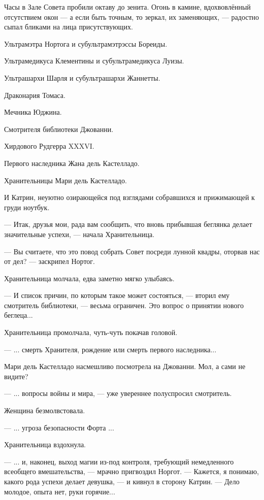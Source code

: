 Часы в Зале Совета пробили октаву до зенита.
Огонь в камине, вдохвовлённый отсутствием окон --- а если быть точным, то зеркал, их заменяющих, ---
радостно сыпал бликами на лица присутствующих.

Ультрамэтра Нортога и субультрамэтрэссы Бореиды.

Ультрамедикуса Клементины и субультрамедикуса Луизы.

Ультрашархи Шарля и субультрашархи Жаннетты.

Драконария Томаса.

Мечника Юджина.

Смотрителя библиотеки Джованни.

Хирдового Рудгерра XXXVI.


Первого наследника Жана дель Кастелладо.

Хранительницы Мари дель Кастелладо.


И Катрин, неуютно озирающейся под взглядами собравшихся и прижимающей к груди ноутбук.


--- Итак, друзья мои, рада вам сообщить, что вновь прибывшая беглянка делает значительные успехи, ---
начала Хранительница.

--- Вы считаете, что это повод собрать Совет посреди лунной квадры, оторвав нас от дел? --- заскрипел Нортог.

Хранительница молчала, едва заметно мягко улыбаясь.

--- И список причин, по которым такое может состояться, --- вторил ему смотритель библиотеки,
--- весьма ограничен. Это вопрос о принятии нового беглеца...

Хранительница промолчала, чуть-чуть покачав головой.

--- ... смерть Хранителя, рождение или смерть первого наследника...

Мари дель Кастелладо насмешливо посмотрела на Джованни. Мол, а сами не видите?

--- ... вопросы войны и мира, --- уже увереннее полуспросил смотритель.

Женщина безмолвстовала.

--- ... угроза безопасности Форта ...

Хранительница вздохнула.

--- ... и, наконец, выход магии из-под контроля, требующий немедленного всеобщего вмешательства, ---
мрачно пригвоздил Норгот. --- Кажется, я понимаю, какого рода успехи делает девушка, --- и кивнул в сторону Катрин.
--- Дело молодое, опыта нет, руки горячие...

